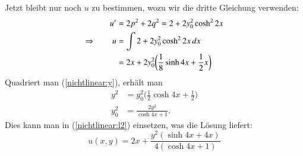Jetzt bleibt nur noch $u$ zu bestimmen, wozu wir die dritte Gleichung
verwenden:
\begin{align}
u'&=2p^2+2q^2=
2 + 2y_0^2\cosh^22x
\notag
\\
\Rightarrow\qquad
u&=\int
2 + 2y_0^2\cosh^22x
\,dx
\notag
\\
&=2x +2y_0^2\biggl(\frac18\sinh 4x+\frac12x\biggr)
\label{nichtlinear:l2}
\end{align}
Quadriert man (\ref{nichtlinear:y}), erhält man
\begin{align*}
y^2
&=
y_0^2\biggl(\frac12\cosh 4x+\frac12\biggr)
\\
y_0^2&=\frac{2y^2}{\cosh4x + 1}.
\end{align*}
Dies kann man in (\ref{nichtlinear:l2}) einsetzen, was die Lösung
liefert:
\begin{equation}
u(x,y)
=
2x+\frac{y^2(\sinh4x+4x)}{4(\cosh4x+1)}
\label{nichtlinear:loesung}
\end{equation}

